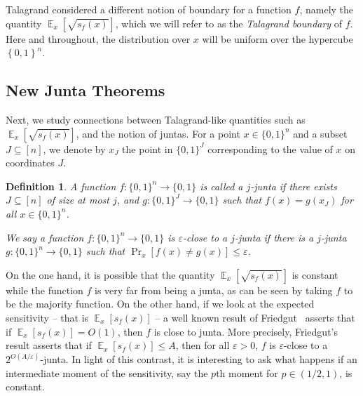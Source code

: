 \documentclass[10pt]{article}
\newcommand{\set}[1]{{\left\{#1\right\}}}
\newcommand{\Prob}[2]{{\Pr_{#1}\left[#2\right]}}
\newcommand{\Expect}[2]{{\mathop{\mathbb E}_{#1}\left[#2\right]}}
\newcommand{\power}[1]{\set{0,1}^{#1}}
\newcommand{\eps}{\varepsilon}
\newtheorem{definition}[thm]{Definition}
\begin{document}
Talagrand considered a different notion of boundary for a function $f$, namely the quantity $\Expect{x}{\sqrt{s_f(x)}}$, which we will refer to as the \emph{Talagrand boundary} of $f$.
Here and throughout, the distribution over $x$ will be uniform over the hypercube $\power{n}$.
\setcounter{subsection}{3}\setcounter{thm}{3}
\subsection{New Junta Theorems}
Next, we study connections between Talagrand-like quantities such as $\Expect{x}{\sqrt{s_f(x)}}$, and the notion of juntas.
For a point $x\in \{0,1\}^n$ and a subset $J\subseteq [n]$, we denote by $x_J$ the point in $\{0,1\}^J$ corresponding to
the value of $x$ on coordinates $J$.
\begin{definition}
  A function $f\colon\{0,1\}^n\to\{0,1\}$ is called a $j$-junta if there exists $J\subseteq [n]$ of size at most $j$,
  and $g\colon \{0,1\}^J\to\{0,1\}$ such that $f(x) = g(x_J)$ for all $x\in\{0,1\}^n$.

  We say a function $f\colon\{0,1\}^n\to\{0,1\}$ is $\eps$-close to a $j$-junta if there is a $j$-junta $g\colon\{0,1\}^n\to\{0,1\}$
  such that $\Prob{x}{f(x)\neq g(x)}\leq \eps$.
\end{definition}
On the one hand, it is possible that the quantity $\Expect{x}{\sqrt{s_f(x)}}$ is constant while the function $f$ is very far from being a junta,
as can be seen by taking $f$ to be the majority function. On the other hand, if we look at the expected sensitivity -- that is
$\Expect{x}{s_f(x)}$ -- a well known result of Friedgut~\cite{Friedgut} asserts that if $\Expect{x}{s_f(x)} = O(1)$, then $f$
is close to junta. More precisely, Friedgut's result asserts that if $\Expect{x}{s_f(x)} \leq A$, then
for all $\eps>0$, $f$ is $\eps$-close to a $2^{O(A/\eps)}$-junta. In light of this contrast, it is interesting to ask
what happens if an intermediate moment of the sensitivity, say the $p$th moment for $p\in (1/2,1)$, is constant.
\end{document}
